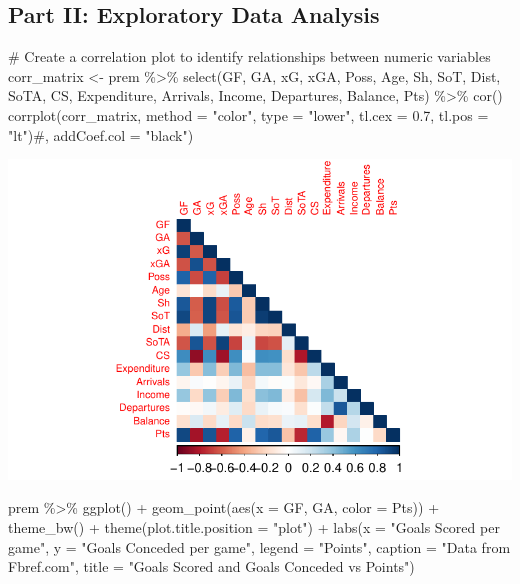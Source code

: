 \documentclass[
  letterpaper,
  DIV=11,
  numbers=noendperiod]{scrartcl}
\newenvironment{Shaded}{\begin{snugshade}}{\end{snugshade}}
\newcommand{\AttributeTok}[1]{\textcolor[rgb]{0.40,0.45,0.13}{#1}}
\newcommand{\CommentTok}[1]{\textcolor[rgb]{0.37,0.37,0.37}{#1}}
\newcommand{\FloatTok}[1]{\textcolor[rgb]{0.68,0.00,0.00}{#1}}
\newcommand{\FunctionTok}[1]{\textcolor[rgb]{0.28,0.35,0.67}{#1}}
\newcommand{\NormalTok}[1]{\textcolor[rgb]{0.00,0.23,0.31}{#1}}
\newcommand{\OtherTok}[1]{\textcolor[rgb]{0.00,0.23,0.31}{#1}}
\newcommand{\SpecialCharTok}[1]{\textcolor[rgb]{0.37,0.37,0.37}{#1}}
\newcommand{\StringTok}[1]{\textcolor[rgb]{0.13,0.47,0.30}{#1}}
\begin{document}
\subsection{Part II: Exploratory Data
Analysis}\label{part-ii-exploratory-data-analysis}

\begin{Shaded}
\begin{Highlighting}[]
\CommentTok{\# Create a correlation plot to identify relationships between numeric variables}
\NormalTok{corr\_matrix }\OtherTok{\textless{}{-}}\NormalTok{ prem }\SpecialCharTok{\%\textgreater{}\%} 
  \FunctionTok{select}\NormalTok{(GF, GA, xG, xGA, Poss, Age, Sh, SoT, Dist, SoTA, CS, Expenditure, Arrivals, Income, Departures, Balance, Pts) }\SpecialCharTok{\%\textgreater{}\%} 
  \FunctionTok{cor}\NormalTok{()}
\FunctionTok{corrplot}\NormalTok{(corr\_matrix, }\AttributeTok{method =} \StringTok{"color"}\NormalTok{, }\AttributeTok{type =} \StringTok{"lower"}\NormalTok{, }\AttributeTok{tl.cex =} \FloatTok{0.7}\NormalTok{, }\AttributeTok{tl.pos =} \StringTok{"lt"}\NormalTok{)}\CommentTok{\#, addCoef.col = "black")}
\end{Highlighting}
\end{Shaded}

\includegraphics{project_part_3_files/figure-pdf/correlation-plot-1.pdf}

\begin{Shaded}
\begin{Highlighting}[]
\NormalTok{prem }\SpecialCharTok{\%\textgreater{}\%}
  \FunctionTok{ggplot}\NormalTok{() }\SpecialCharTok{+}
  \FunctionTok{geom\_point}\NormalTok{(}\FunctionTok{aes}\NormalTok{(}\AttributeTok{x =}\NormalTok{ GF, GA, }\AttributeTok{color =}\NormalTok{ Pts)) }\SpecialCharTok{+}
  \FunctionTok{theme\_bw}\NormalTok{() }\SpecialCharTok{+}
  \FunctionTok{theme}\NormalTok{(}\AttributeTok{plot.title.position =} \StringTok{"plot"}\NormalTok{) }\SpecialCharTok{+}
  \FunctionTok{labs}\NormalTok{(}\AttributeTok{x =} \StringTok{"Goals Scored per game"}\NormalTok{,}
       \AttributeTok{y =} \StringTok{"Goals Conceded per game"}\NormalTok{,}
       \AttributeTok{legend =} \StringTok{"Points"}\NormalTok{,}
       \AttributeTok{caption =} \StringTok{"Data from Fbref.com"}\NormalTok{,}
       \AttributeTok{title =} \StringTok{"Goals Scored and Goals Conceded vs Points"}\NormalTok{)}
\end{Highlighting}
\end{Shaded}
\end{document}
